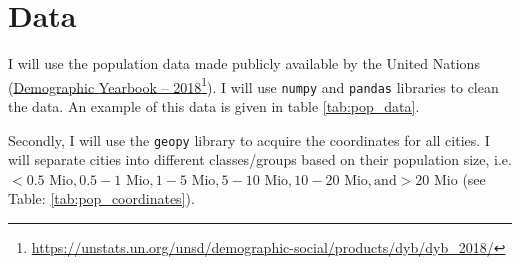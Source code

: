 \documentclass[11pt,a4paper,final]{article}
\begin{document}
\section{Data}
I will use the population data made publicly available by the United Nations (\href{https://unstats.un.org/unsd/demographic-social/products/dyb/documents/DYB2018/table08.xls}{Demographic Yearbook – 2018}\footnote{\url{https://unstats.un.org/unsd/demographic-social/products/dyb/dyb_2018/}}). I will use \texttt{numpy} and \texttt{pandas} libraries to clean the data. An example of this data is given in table \ref{tab:pop_data}.

\begin{table}[h!]
\centering
{}\caption{Cleaned population data}\label{tab:pop_data}
\end{table}

Secondly, I will use the \texttt{geopy} library to acquire the coordinates for all cities. I will separate cities into different classes/groups based on their population size, i.e. $ < 0.5\text{ Mio}, 0.5-1\text{ Mio}, 1-5\text{ Mio}, 5-10\text{ Mio}, 10-20\text{ Mio}, \text{and} >20\text{ Mio}$ (see Table: \ref{tab:pop_coordinates}).\\
\end{document}
